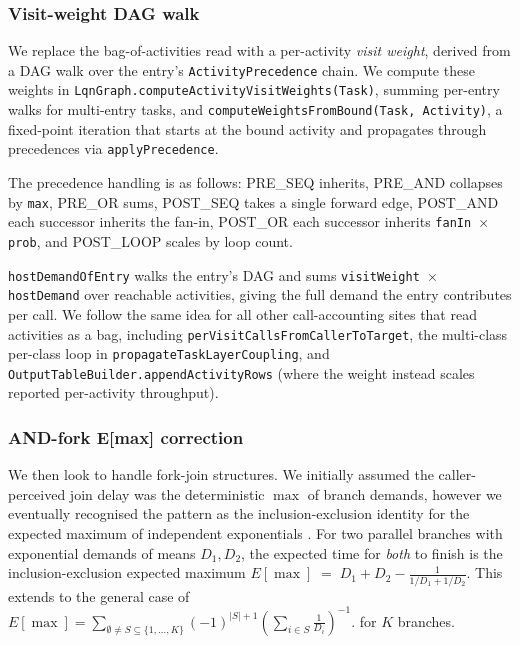 \subsubsection*{Visit-weight DAG walk}

We replace the bag-of-activities read with a per-activity \textit{visit weight}, derived from a DAG walk over the entry's \texttt{ActivityPrecedence} chain. We compute these weights in \texttt{LqnGraph.computeActivityVisitWeights(Task)}, summing per-entry walks for multi-entry tasks, and \texttt{computeWeightsFromBound(Task, Activity)}, a fixed-point iteration that starts at the bound activity and propagates through precedences via \texttt{applyPrecedence}. 

The precedence handling is as follows: PRE\_SEQ inherits, PRE\_AND collapses by \texttt{max}, PRE\_OR sums, POST\_SEQ takes a single forward edge, POST\_AND each successor inherits the fan-in, POST\_OR each successor inherits \texttt{fanIn $\times$ prob}, and POST\_LOOP scales by loop count. 

\texttt{hostDemandOfEntry} walks the entry's DAG and sums \texttt{visitWeight $\times$ hostDemand} over reachable activities, giving the full demand the entry contributes per call. We follow the same idea for all other call-accounting sites that read activities as a bag, including \texttt{perVisitCallsFromCallerToTarget}, the multi-class per-class loop in \texttt{propagateTaskLayerCoupling}, and \texttt{OutputTableBuilder.appendActivityRows} (where the weight instead scales reported per-activity throughput).

\subsubsection*{AND-fork E[max] correction}

We then look to handle fork-join structures. We initially assumed the caller-perceived join delay was the deterministic $\max$ of branch demands, however we eventually recognised the pattern as the inclusion-exclusion identity for the expected maximum of independent exponentials \cite{franks99}. For two parallel branches with exponential demands of means $D_1,D_2$, the expected time for \emph{both} to finish is the inclusion-exclusion expected maximum $E[\max] \;=\; D_1 + D_2 - \frac{1}{1/D_1 + 1/D_2}$. This extends to the general case of $E[\max] = \sum_{\emptyset\neq S\subseteq\{1,\dots,K\}} (-1)^{|S|+1} \left(\sum_{i\in S}\frac{1}{D_i}\right)^{-1}.$ for $K$ branches.

